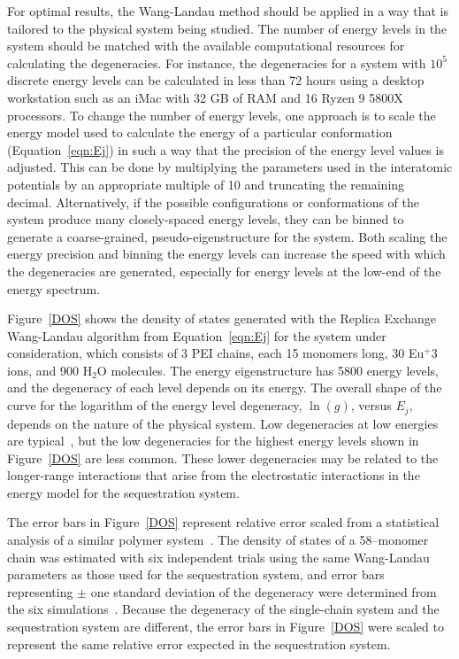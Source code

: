 \documentclass[
journal=jcisd8, %
manuscript=article,
layout=twocolumn   %
]{achemso}
\begin{document}
For optimal results, the Wang-Landau method should be applied in a way that is tailored to the physical system being studied. The number of energy levels in the system should be matched with the available computational resources for calculating the degeneracies. For instance, the degeneracies for a system with $10^5$ discrete energy levels can be calculated in less than 72 hours using a desktop workstation such as an iMac with 32 GB of RAM and 16 Ryzen 9
5800X processors. To change the number of energy levels, one approach is to scale the energy model used to calculate the energy of a particular conformation (Equation~\ref{eqn:Ej}) in such a way that the precision of the energy level values is adjusted. This can be done by multiplying the parameters used in the interatomic potentials by an appropriate multiple of 10 and truncating the remaining decimal. Alternatively, if the possible configurations or conformations of the system produce many closely-spaced energy levels, they can be binned to generate a coarse-grained, pseudo-eigenstructure for the system. Both scaling the energy precision and binning the energy levels can increase the speed with which the degeneracies are generated, especially for energy levels at the low-end of the energy spectrum.

Figure~\ref{DOS} shows the density of states generated with the Replica Exchange Wang-Landau algorithm from Equation~\ref{eqn:Ej} for the system under consideration, which consists of 3 PEI chains, each 15 monomers long, 30 Eu$^+3$ ions, and 900 H$_2$O molecules. The energy eigenstructure has 5800 energy levels, and the degeneracy of each level depends on its energy. The overall shape of the curve for the logarithm of the energy level degeneracy, $\ln(g)$, versus $E_j$, depends on the nature of the physical system. Low degeneracies at low energies are typical~\cite{McDonald2022,McDonald2023polymer,Younis2022}, but the low degeneracies for the highest energy levels shown in Figure~\ref{DOS} are less common. These lower degeneracies may be related to the longer-range interactions that arise from the electrostatic interactions in the  energy model for the sequestration system. 

The error bars in Figure~\ref{DOS} represent relative error scaled from a statistical analysis of a similar polymer system~\cite{McDonald2023polymer}. The density of states of a 58--monomer chain was estimated with six independent trials using the same Wang-Landau parameters as those used for the sequestration system, and error bars representing $\pm$ one standard deviation of the degeneracy were determined from the six simulations~\cite{McDonald2023polymer}.  Because the degeneracy of the single-chain system and the sequestration system are different, the error bars in Figure~\ref{DOS} were scaled to represent the same relative error expected in the sequestration system.
\end{document}
